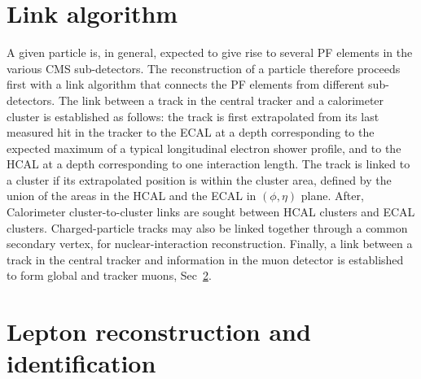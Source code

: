 \section{Link algorithm}
A given particle is, in general, expected to give rise to several PF elements in the various CMS
sub-detectors. The reconstruction of a particle therefore proceeds first with a
link algorithm that connects the PF elements from different sub-detectors.
The link between a track in the central tracker and a calorimeter cluster is established as follows:
the track is first extrapolated from its last measured hit in the tracker to
the ECAL at a depth corresponding to the expected maximum of a typical longitudinal electron shower
profile, and to the HCAL at a depth corresponding to one interaction length.  
The track is linked to a cluster if its extrapolated position is within the cluster area, defined by the union of the
areas in the HCAL and the ECAL in $(\phi, \eta)$ plane. 
After, Calorimeter cluster-to-cluster links are sought between HCAL clusters and ECAL clusters.
Charged-particle tracks may also be linked together through a common secondary vertex, for
nuclear-interaction reconstruction.
Finally, a link between a track in the central tracker and information in the muon detector is
established to form global and tracker muons, Sec~\ref{ler}.\\



\section{Lepton reconstruction and identification}
\label{ler}
